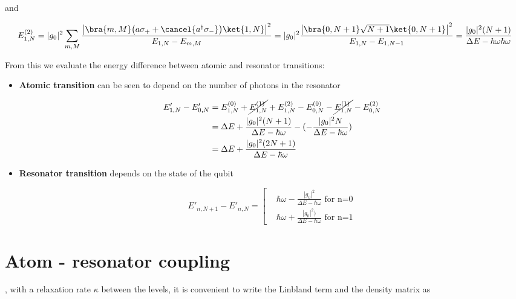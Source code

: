 \noindent and

\begin{equation}\label{sec1}
  E_{1,N}^{(2)} = |g_0|^2\sum_{m,M}\frac{\left|\bra{m,M}\big({a\sigma_{+}}+\cancel{a^{\dagger}\sigma_{-}}\big)\ket{1,N}\right|^2}{E_{1,N}-E_{m,M}}= |g_0|^2\frac{\left|\bra{0,N+1}\sqrt{N+1}\ket{0,N+1}\right|^2}{E_{1,N}-E_{1,N-1}} = \frac{|g_0|^2(N+1)}{\Delta E - \hbar\omega \hbar\omega}
\end{equation}

\noindent  From  this  we evaluate  the  energy  difference
between atomic and resonator transitions:

\begin{itemize}
\item \textbf{Atomic  transition} can be seen  to depend on
  the number of photons in the resonator
	
	\begin{equation}\label{secAtom}\begin{aligned}
            E'_{1,N}-E'_{0,N}    &   =    E_{1,N}^{(0)}   +
            \cancel{E_{1,N}^{(1)}}   +    E_{1,N}^{(2)}   -
            E_{0,N}^{(0)}   -    \cancel{E_{1,N}^{(1)}}   -
            E_{0,N}^{(2)} \\& = \Delta E + \frac{|g_0|^2(N+1)}{\Delta
              E -  \hbar\omega} - (-\frac{|g_0|^2N}{\Delta E  - \hbar\omega})\\& =
            {\Delta E+\frac{|g_0|^2(2N+1)}{\Delta E - \hbar\omega}}
          \end{aligned}
	\end{equation}
      \item  \textbf{Resonator transition}  depends on  the
        state of the qubit
	
	\begin{equation}\label{secRes}
          E'_{n,N+1}-E'_{n,N} = \left[\begin{aligned}
              & \hbar\omega  -\frac{|g_0|^2}{\Delta E -  \hbar\omega} \text{ for n=0}
              \\&  \hbar\omega + {\frac{|g_0|^2)}{\Delta E -  \hbar\omega}}\text{ for n=1}
            \end{aligned}\right.
	\end{equation}
      \end{itemize}

      \newpage

      \section{Atom - resonator coupling}
      \noindent   {},  with a  relaxation
      rate $  \kappa $ between  the levels, it is  convenient to
      write the Linbland term and the density matrix as

